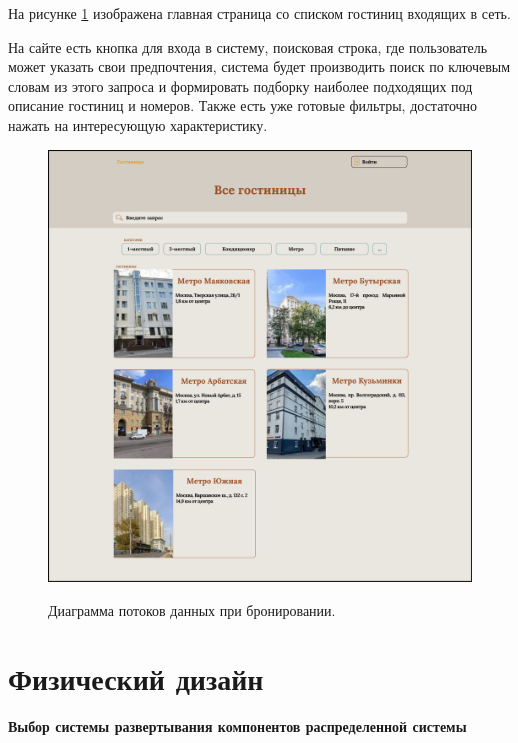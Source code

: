 На рисунке \ref{fig:ui-hotels} изображена главная страница со списком гостиниц входящих в сеть. 

На сайте есть кнопка для входа в систему, поисковая строка, где пользователь может указать свои предпочтения, система будет производить поиск по ключевым словам из этого запроса и формировать подборку наиболее подходящих под описание гостиниц и номеров. Также есть уже готовые фильтры, достаточно нажать на интересующую характеристику.

\begin{figure}[h]
	\begin{center}
		{\includegraphics[scale = 0.3]{img/ui/hotels.pdf}}
		\caption{Диаграмма потоков данных при бронировании.}
		\label{fig:ui-hotels}
	\end{center}
\end{figure} 

\pagebreak

\section*{Физический дизайн}

\textbf{Выбор системы развертывания компонентов распределенной системы}


